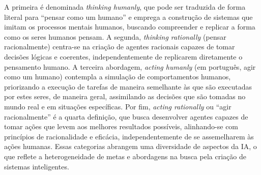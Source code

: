 A primeira é denominada \textit{thinking humanly}, que pode ser traduzida de forma literal para ``pensar como um humano'' e emprega a construção de sistemas que imitam os processos mentais humanos, buscando compreender e replicar a forma como os seres humanos pensam. A segunda, \textit{thinking rationally} (pensar racionalmente) centra-se na criação de agentes racionais capazes de tomar decisões lógicas e coerentes, independentemente de replicarem diretamente o pensamento humano. A terceira abordagem, \textit{acting humanly} (em português, agir como um humano) contempla a simulação de comportamentos humanos, priorizando a execução de tarefas de maneira semelhante às que são executadas por estes seres, de maneira geral, assimilando as decisões que são tomadas no mundo real e em situações específicas. Por fim, \textit{acting rationally} ou ``agir racionalmente'' é a quarta definição, que busca desenvolver agentes capazes de tomar ações que levem aos melhores resultados possíveis, alinhando-se com princípios de racionalidade e eficácia, independentemente de se assemelharem às ações humanas. Essas categorias abrangem uma diversidade de aspectos da IA, o que reflete a heterogeneidade de metas e abordagens na busca pela criação de sistemas inteligentes.

